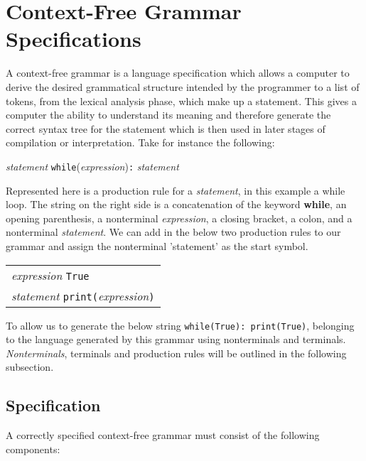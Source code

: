 \documentclass[a4paper, 11pt]{article}
\begin{document}

\clearpage
\section{Context-Free Grammar Specifications}
A context-free grammar is a language specification which allows a computer to derive the desired grammatical structure intended by the programmer to a list of tokens, from the lexical analysis phase, which make up a statement. This gives a computer the ability to understand its meaning and therefore generate the correct syntax tree for the statement which is then used in later stages of compilation or interpretation. Take for instance the following:

\begin{center}
	\textit{statement} \textbf{\textrightarrow} \texttt{while}(\textit{expression})\texttt{:} \textit{statement}
\end{center}

\noindent Represented here is a production rule for a \textit{statement}, in this example a while loop. The string on the right side is a concatenation of the keyword \textbf{while}, an opening parenthesis, a nonterminal \textit{expression}, a closing bracket, a colon, and a nonterminal \textit{statement}. We can add in the below two production rules to our grammar and assign the nonterminal 'statement' as the start symbol.

\begin{center}
	\begin{tabular}{l}
		\textit{expression} \textbf{\textrightarrow} \texttt{True} \\
		\textit{statement} \textbf{\textrightarrow} \texttt{print(}\textit{expression}\texttt{)}
	\end{tabular}
\end{center}

To allow us to generate the below string \texttt{while(True): print(True)}, belonging to the language generated by this grammar using nonterminals and terminals. \textit{Nonterminals}, terminals and production rules will be outlined in the following subsection.

\subsection{Specification}
A correctly specified context-free grammar must consist of the following components:
\end{document}
